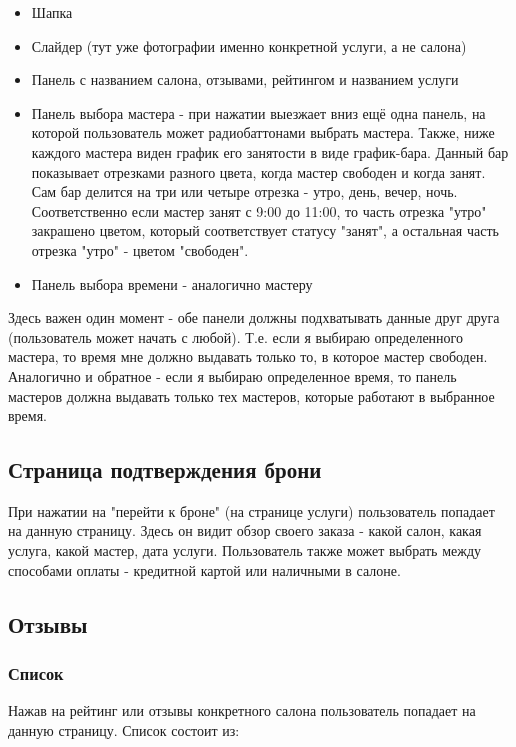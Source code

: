\documentclass[DIV=calc, paper=a4, fontsize=11pt]{scrartcl} %
\begin{document}
\begin{itemize}
	\item Шапка
	\item Слайдер (тут уже фотографии именно конкретной услуги, а не салона)
	\item Панель с названием салона, отзывами, рейтингом и названием услуги
	\item Панель выбора мастера - при нажатии выезжает вниз ещё одна панель, на которой пользователь может радиобаттонами выбрать мастера. Также, ниже каждого мастера виден график его занятости в виде график-бара. Данный бар показывает отрезками разного цвета, когда мастер свободен и когда занят. Сам бар делится на три или четыре отрезка - утро, день, вечер, ночь. Соответственно если мастер занят с 9:00 до 11:00, то часть отрезка "утро" закрашено цветом, который соответствует статусу "занят", а остальная часть отрезка "утро" - цветом "свободен".
	\item Панель выбора времени - аналогично мастеру
\end{itemize}

Здесь важен один момент - обе панели должны подхватывать данные друг друга (пользователь может начать с любой). Т.е. если я выбираю определенного мастера, то время мне должно выдавать только то, в которое мастер свободен.
\\[0.5cm]
Аналогично и обратное - если я выбираю определенное время, то панель мастеров должна выдавать только тех мастеров, которые работают в выбранное время.

\subsection{Страница подтверждения брони}
При нажатии на "перейти к броне" (на странице услуги) пользователь попадает на данную страницу. Здесь он видит обзор своего заказа - какой салон, какая услуга, какой мастер, дата услуги. Пользователь также может выбрать между способами оплаты - кредитной картой или наличными в салоне.

\subsection{Отзывы}

\subsubsection{Список}

Нажав на рейтинг или отзывы конкретного салона пользователь попадает на данную страницу. Список состоит из:
\end{document}
